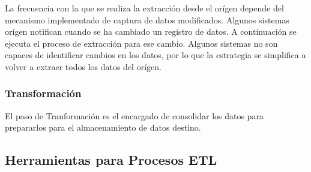 La frecuencia con la que se realiza la extracci\'on desde el or\'igen depende del mecanismo implementado de captura de datos 
modificados. Algunos sistemas or\'igen notifican cuando se ha cambiado un registro de datos. A continuaci\'on se ejecuta el 
proceso de extracci\'on para ese cambio. Algunos sistemas no son capaces de identificar cambios en los datos, por lo que 
la estrategia se simplifica a volver a extraer todos los datos del or\'igen.

\subsubsection{Transformaci\'on}

El paso de Tranformaci\'on es el encargado de consolidar los datos para prepararlos para el almacenamiento de datos destino. 


\subsection{Herramientas para Procesos ETL}
